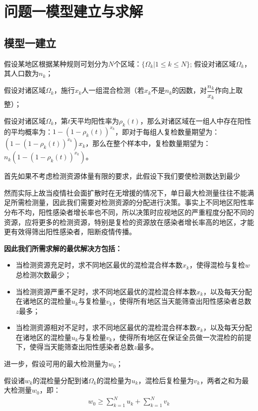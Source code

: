 \documentclass[withoutpreface,bwprint]{cumcmthesis} %
\begin{document}
\section{问题一模型建立与求解}

\subsection{模型一建立}
假设某地区根据某种规则可划分为$N$个区域：$\{\Omega_k \vert 1\leq k \leq N \}$;
假设对诸区域$\Omega_k$，其人口数为$n_k$；

假设对诸区域$\Omega_k$，施行$x_k$人一组混合检测（若$x_k$不是$n_k$的因数，对$\dfrac{n_k}{x_k}$作向上取整）；

假设对诸区域$\Omega_k$，第$t$天平均阳性率为$\rho_k(t)$，那么对诸区域在一组人中存在阳性的平均概率为：$1-(1-\rho_k(t))^{x_k}$，即对于每组人复检数量期望为：$(1-(1-\rho_k(t))^{x_k})x_k$，那么在整个样本中，复检数量期望为：$n_k(1-(1-\rho_k(t))^{x_k})$。

首先如果不考虑检测资源体量有限的要求，此假设下我们要使检测数达到最少

然而实际上故当疫情社会面扩散时在无增援的情况下，单日最大检测量往往不能满足所需检测量，因此我们需要对检测资源的分配进行决策。事实上不同地区阳性率分布不均，阳性感染者增长率也不同，所以决策时应视地区的严重程度分配不同的资源，应将更多的检测资源，特别是复检的资源放在感染者增长率高的地区，才能更有效得筛出阳性感染者，阻断疫情传播。

\textbf{因此我们所需求解的最优解决方包括：}
\begin{itemize}
    \item 当检测资源充足时，求不同地区最优的混检混合样本数$x_k$，使得混检与复检$w$总检测次数最少；
    \item 当检测资源严重不足时，求不同地区最优的混检混合样本数$x_k$，以及每天分配在诸地区的混检量$u_k$与复检量$v_k$，使得所有地区当天能筛查出阳性感染者总数$z$最多；
    \item 当检测资源相对不足时，求不同地区最优的混检混合样本数$x_k$，以及每天分配在诸地区的混检量$u_k$与复检量$v_k$，使得所有地区在保证全员做一次混检的前提下，使得当天能筛查出阳性感染者总数$z$最多。
\end{itemize}

进一步，假设可用的最大检测量为$w_0$；

假设诸$w_k$的混检量分配到诸$\Omega_k$的混检量为$u_{k}$，混检后复检量为$v_{k}$，两者之和为最大检测量$w_0$，即：
\begin{align}
    w_0 \geqslant \sum^N_{k=1} u_k +\sum^N_{k=1} v_k
\end{align}
\end{document}
